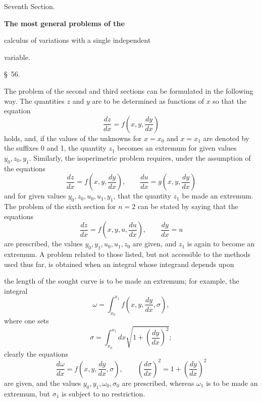 \documentclass[11pt,a4paper,leqno]{article}
\begin{document}


\begin{center}
{\Large Seventh Section.}

\vspace{1em}
{\Large\bfseries The most general problems of the\par
calculus of variations with a single independent\par
variable.}

\vspace{1em}
{\large \S~56.}
\end{center}

The problem of the second and third sections can be formulated in the
following way. The quantities $z$ and $y$ are to be determined as functions
of $x$ so that the equation
\[
\frac{dz}{dx}=f\left(x,y,\frac{dy}{dx}\right)
\]
holds, and, if the values of the unknowns for $x=x_0$ and $x=x_1$ are
denoted by the suffixes 0 and 1, the quantity $z_1$ becomes an extremum for
given values $y_0,z_0,y_1$. Similarly, the isoperimetric problem requires,
under the assumption of the equations
\[
\frac{dz}{dx}=f\left(x,y,\frac{dy}{dx}\right),\qquad
\frac{du}{dx}=g\left(x,y,\frac{dy}{dx}\right)
\]
and for given values $y_0,z_0,u_0,u_1,y_1$, that the quantity $z_1$ be made
an extremum. The problem of the sixth section for $n=2$ can be stated by
saying that the equations
\[
\frac{dz}{dx}=f\left(x,y,u,\frac{du}{dx}\right),\qquad
\frac{dy}{dx}=u
\]
are prescribed, the values $y_0,y_1,u_0,u_1,z_0$ are given, and $z_1$ is
again to become an extremum. A problem related to those listed, but not
accessible to the methods used thus far, is obtained when an integral whose
integrand depends upon

the length of the sought curve is to be made an extremum; for example, the
integral
\[
\omega=\int_{x_0}^{x_1}f\left(x,y,\frac{dy}{dx},\sigma\right),
\]
where one sets
\[
\sigma=\int_{x_0}^{x_1}dx\sqrt{1+\left(\frac{dy}{dx}\right)^2};
\]
clearly the equations
\[
\frac{d\omega}{dx}=f\left(x,y,\frac{dy}{dx},\sigma\right),\qquad
\left(\frac{d\sigma}{dx}\right)^2=1+\left(\frac{dy}{dx}\right)^2
\]
are given, and the values $y_0,y_1,\omega_0,\sigma_0$ are prescribed,
whereas $\omega_1$ is to be made an extremum, but $\sigma_1$ is subject to
no restriction.
\end{document}
